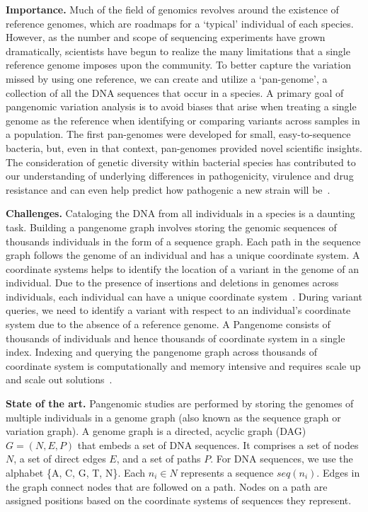 \noindent
\textbf{Importance.}
Much of the field of genomics revolves around the existence of reference genomes, which are roadmaps for a ‘typical’ individual of each species.  However, as the number and scope of sequencing experiments have grown dramatically, scientists have begun to realize the many limitations that a single reference genome imposes upon the community. To better capture the variation missed by using one reference, we can create and utilize a ‘pan-genome’, a collection of all the DNA sequences that occur in a species.
A primary goal of pangenomic variation analysis is to avoid biases that arise when treating a single genome as the reference when identifying or comparing variants across samples in a population.
The first pan-genomes were developed for small, easy-to-sequence bacteria, but, even in that context, pan-genomes provided novel scientific insights. The consideration of genetic diversity within bacterial species has contributed to our understanding of underlying differences in pathogenicity, virulence and drug resistance and can even help predict how pathogenic a new strain will be~\cite{sherman2020pan}.

\noindent
\textbf{Challenges.}
Cataloging the DNA from all individuals in a species is a daunting task.
Building a pangenome graph involves storing the genomic sequences of thousands individuals in the form of a sequence graph. Each path in the sequence graph follows the genome of an individual and has a unique coordinate system. A coordinate systems helps to identify the location of a variant in the genome of an individual. Due to the presence of insertions and deletions in genomes across individuals, each individual can have a unique coordinate system~\cite{pandey2021variantstore}.
During variant queries, we need to identify a variant with respect to an individual's coordinate system due to the absence of a reference genome.
A Pangenome consists of thousands of individuals and hence thousands of coordinate system in a single index. Indexing and querying the pangenome graph across thousands of coordinate system is computationally and memory intensive and requires scale up and scale out solutions~\cite{garrison2018variation,pandey2021variantstore}.

\noindent
\textbf{State of the art.}
Pangenomic studies are performed by storing the genomes of multiple individuals in a genome graph (also known as the sequence graph or variation graph). A genome graph is a directed, acyclic graph (DAG) $G = (N, E, P)$ that embeds a set of DNA sequences. It comprises a set of nodes $N$, a set of direct edges $E$, and a set of paths $P$. For DNA sequences, we use the alphabet \{A, C, G, T, N\}\@. Each $n_i \in N$ represents a sequence $seq(n_i)$. Edges in the graph connect nodes that are followed on a path. Nodes on a path are assigned positions based on the coordinate systems of sequences they represent.

